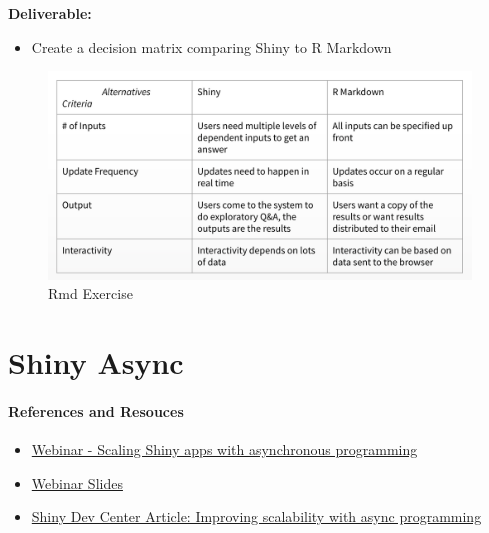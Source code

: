 \documentclass[]{book}
\providecommand{\tightlist}{%
  \setlength{\itemsep}{0pt}\setlength{\parskip}{0pt}}
\theoremstyle{definition}
\theoremstyle{definition}
\theoremstyle{definition}
\theoremstyle{remark}
\begin{document}
\textbf{Deliverable:}

\begin{itemize}
\tightlist
\item
  Create a decision matrix comparing Shiny to R Markdown
\end{itemize}

\begin{figure}
\centering
\includegraphics{imgs/shiny-alt/rmd-answers.png}
\caption{Rmd Exercise}
\end{figure}

\hypertarget{shiny-async}{%
\chapter{Shiny Async}\label{shiny-async}}

\hypertarget{references-and-resouces}{%
\subsubsection{References and Resouces}\label{references-and-resouces}}

\begin{itemize}
\tightlist
\item
  \href{https://resources.rstudio.com/webinars/scaling-shiny-apps-with-async-programming-june-2018}{Webinar
  - Scaling Shiny apps with asynchronous programming}
\item
  \href{https://github.com/rstudio/webinars/blob/master/56-scaling-shiny-apps/Scaling\%20Shiny\%20apps\%20with\%20async\%20programming.pdf}{Webinar
  Slides}
\item
  \href{http://shiny.rstudio.com/articles/async.html}{Shiny Dev Center
  Article: Improving scalability with async programming}
\end{itemize}
\end{document}
